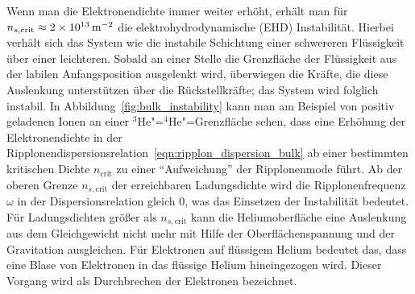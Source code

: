 Wenn man die Elektronendichte immer weiter erhöht, erhält man für $n_{s,\text{crit}}\approx\unit[2\times10^{13}]{\Em}$ \cite{Gor73,Mim78,Wan79,Ebn80,Wil82} die elektrohydrodynamische (EHD) Instabilität. Hierbei verhält sich das System wie die instabile Schichtung einer schwereren Flüssigkeit über einer leichteren. Sobald an einer Stelle die Grenzfläche der Flüssigkeit aus der labilen Anfangsposition ausgelenkt wird, überwiegen die Kräfte, die diese Auslenkung unterstützen über die Rückstellkräfte; das System wird folglich instabil. In Abbildung~\ref{fig:bulk_instability} kann man am Beispiel von positiv geladenen Ionen an einer $^3$He"=$^4$He"=Grenzfläche sehen, dass eine Erhöhung der Elektronendichte in der Ripplonendispersionsrelation~\eqref{eqn:ripplon_dispersion_bulk} ab einer bestimmten kritischen Dichte $n_\text{crit}$ zu einer "`Aufweichung"' der Ripplonenmode führt. Ab der oberen Grenze $n_{s,\text{crit}}$ der erreichbaren Ladungsdichte wird die Ripplonenfrequenz $\omega$ in der Dispersionsrelation gleich 0, was das Einsetzen der Instabilität bedeutet. Für Ladungsdichten größer als $n_{s,\text{crit}}$ kann die Heliumoberfläche eine Auslenkung aus dem Gleichgewicht nicht mehr mit Hilfe der Oberflächenspannung und der Gravitation ausgleichen. Für Elektronen auf flüssigem Helium bedeutet das, dass eine Blase von Elektronen in das flüssige Helium hineingezogen wird. Dieser Vorgang wird als Durchbrechen der Elektronen bezeichnet.

